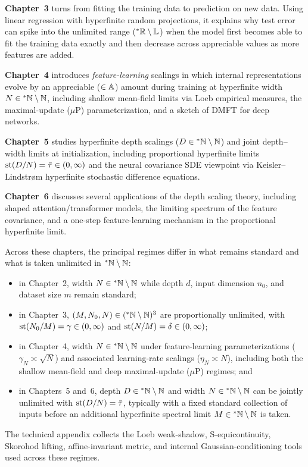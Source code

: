 \textbf{Chapter~3} turns from fitting the training data to prediction on new data. Using linear regression with hyperfinite random projections, it explains why test error can spike into the unlimited range (${}^*\mathbb{R} \setminus \mathbb{L}$) when the model first becomes able to fit the training data exactly and then decrease across appreciable values as more features are added.

\textbf{Chapter~4} introduces \emph{feature-learning} scalings in which internal representations evolve by an appreciable ($\in \mathbb{A}$) amount during training at hyperfinite width $N \in {}^*\mathbb{N} \setminus \mathbb{N}$, including shallow mean-field limits via Loeb empirical measures, the maximal-update ($\mu$P) parameterization, and a sketch of DMFT for deep networks.

\textbf{Chapter~5} studies hyperfinite depth scalings ($D \in {}^*\mathbb{N} \setminus \mathbb{N}$) and joint depth--width limits at initialization, including proportional hyperfinite limits $\operatorname{st}(D/N) = \bar{\tau} \in (0,\infty)$ and the neural covariance SDE viewpoint via Keisler--Lindstr\o m hyperfinite stochastic difference equations.

\textbf{Chapter~6} discusses several applications of the depth scaling theory, including shaped attention/transformer models, the limiting spectrum of the feature covariance, and a one-step feature-learning mechanism in the proportional hyperfinite limit.

Across these chapters, the principal regimes differ in what remains standard and what is taken unlimited in ${}^*\mathbb{N} \setminus \mathbb{N}$:
\begin{itemize}
\item in Chapter~2, width $N \in {}^*\mathbb{N} \setminus \mathbb{N}$ while depth $d$, input dimension $n_0$, and dataset size $m$ remain standard;
\item in Chapter~3, $(M, N_0, N) \in ({}^*\mathbb{N} \setminus \mathbb{N})^3$ are proportionally unlimited, with $\operatorname{st}(N_0/M) = \gamma \in (0,\infty)$ and $\operatorname{st}(N/M) = \delta \in (0,\infty)$;
\item in Chapter~4, width $N \in {}^*\mathbb{N} \setminus \mathbb{N}$ under feature-learning parameterizations ($\gamma_N \asymp \sqrt{N}$) and associated learning-rate scalings ($\eta_N \asymp N$), including both the shallow mean-field and deep maximal-update ($\mu$P) regimes; and
\item in Chapters~5 and~6, depth $D \in {}^*\mathbb{N} \setminus \mathbb{N}$ and width $N \in {}^*\mathbb{N} \setminus \mathbb{N}$ can be jointly unlimited with $\operatorname{st}(D/N) = \bar{\tau}$, typically with a fixed standard collection of inputs before an additional hyperfinite spectral limit $M \in {}^*\mathbb{N} \setminus \mathbb{N}$ is taken.
\end{itemize}

The technical appendix collects the Loeb weak-shadow, S-equicontinuity, Skorohod lifting, affine-invariant metric, and internal Gaussian-conditioning tools used across these regimes.
